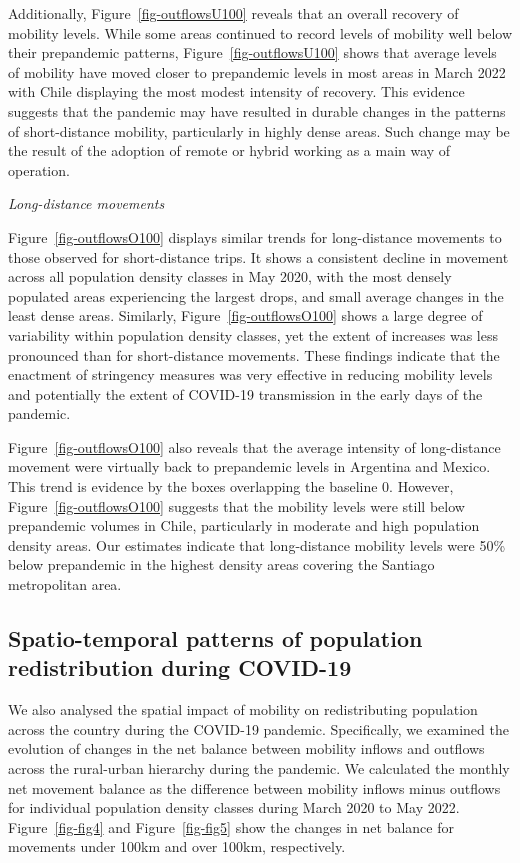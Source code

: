 \documentclass[
  11pt,
]{article}
\begin{document}
Additionally, Figure~\ref{fig-outflowsU100} reveals that an overall
recovery of mobility levels. While some areas continued to record levels
of mobility well below their prepandemic patterns,
Figure~\ref{fig-outflowsU100} shows that average levels of mobility have
moved closer to prepandemic levels in most areas in March 2022 with
Chile displaying the most modest intensity of recovery. This evidence
suggests that the pandemic may have resulted in durable changes in the
patterns of short-distance mobility, particularly in highly dense areas.
Such change may be the result of the adoption of remote or hybrid
working as a main way of operation.

\emph{Long-distance movements}

Figure~\ref{fig-outflowsO100} displays similar trends for long-distance
movements to those observed for short-distance trips. It shows a
consistent decline in movement across all population density classes in
May 2020, with the most densely populated areas experiencing the largest
drops, and small average changes in the least dense areas. Similarly,
Figure~\ref{fig-outflowsO100} shows a large degree of variability within
population density classes, yet the extent of increases was less
pronounced than for short-distance movements. These findings indicate
that the enactment of stringency measures was very effective in reducing
mobility levels and potentially the extent of COVID-19 transmission in
the early days of the pandemic.

Figure~\ref{fig-outflowsO100} also reveals that the average intensity of
long-distance movement were virtually back to prepandemic levels in
Argentina and Mexico. This trend is evidence by the boxes overlapping
the baseline 0. However, Figure~\ref{fig-outflowsO100} suggests that the
mobility levels were still below prepandemic volumes in Chile,
particularly in moderate and high population density areas. Our
estimates indicate that long-distance mobility levels were 50\% below
prepandemic in the highest density areas covering the Santiago
metropolitan area.

\hypertarget{spatio-temporal-patterns-of-population-redistribution-during-covid-19}{%
\subsection{Spatio-temporal patterns of population redistribution during
COVID-19}\label{spatio-temporal-patterns-of-population-redistribution-during-covid-19}}

We also analysed the spatial impact of mobility on redistributing
population across the country during the COVID-19 pandemic.
Specifically, we examined the evolution of changes in the net balance
between mobility inflows and outflows across the rural-urban hierarchy
during the pandemic. We calculated the monthly net movement balance as
the difference between mobility inflows minus outflows for individual
population density classes during March 2020 to May 2022.
Figure~\ref{fig-fig4} and Figure~\ref{fig-fig5} show the changes in net
balance for movements under 100km and over 100km, respectively.
\end{document}
